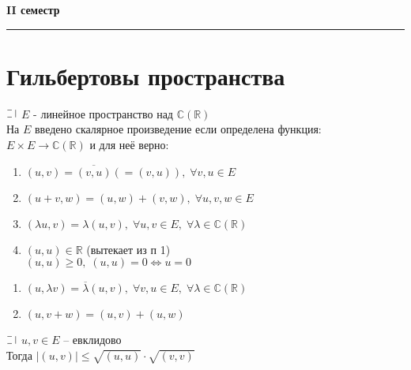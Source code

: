 
\begin{center}
    {\large \bf II семестр}
    \rule{\textwidth}{1pt}
\end{center}

\section*{Гильбертовы пространства}

\begin{definition}
  $\letus$ $E$ - линейное пространство над $\mathbb{C}(\mathbb{R})$\\
  На $E$ введено скалярное произведение если определена функция: $E \times E \rightarrow \mathbb{C}(\mathbb{R})$ и для неё верно:\\
  \begin{minipage}[t]{0.8\linewidth}\begin{enumerate}[itemsep=1mm]
      \item $(u, v) = \overline{(v, u)} (= (v, u)), \; \forall v, u \in E$
      \item $(u + v, w) = (u, w) + (v, w), \; \forall u, v, w \in E$
      \item $(\lambda u, v) = \lambda(u, v), \; \forall u, v \in E, \; \forall \lambda \in \mathbb{C}(\mathbb{R})$
      \item $(u, u) \in \mathbb{R}$ (вытекает из п 1) \\
      $(u, u) \ge 0, \; (u, u) = 0 \Leftrightarrow u = 0$ 
    \end{enumerate}\end{minipage}
\end{definition}

\begin{sled} 
	\begin{minipage}[t]{0.8\linewidth}\begin{enumerate}
		\item  $(u, \lambda v) = \overline\lambda(u, v), \; \forall v, u \in E, \; \forall \lambda \in \mathbb{C}(\mathbb{R})$
		\item  $(u, v+w) = (u, v) + (u, w)$
	\end{enumerate}\end{minipage}
\end{sled}

\begin{theorem}
  $\letus$ $u, v \in E$ -- евклидово\\
  Тогда $|(u, v)| \le \sqrt{(u, u)} \cdot \sqrt{(v, v)}$ 
\end{theorem}

